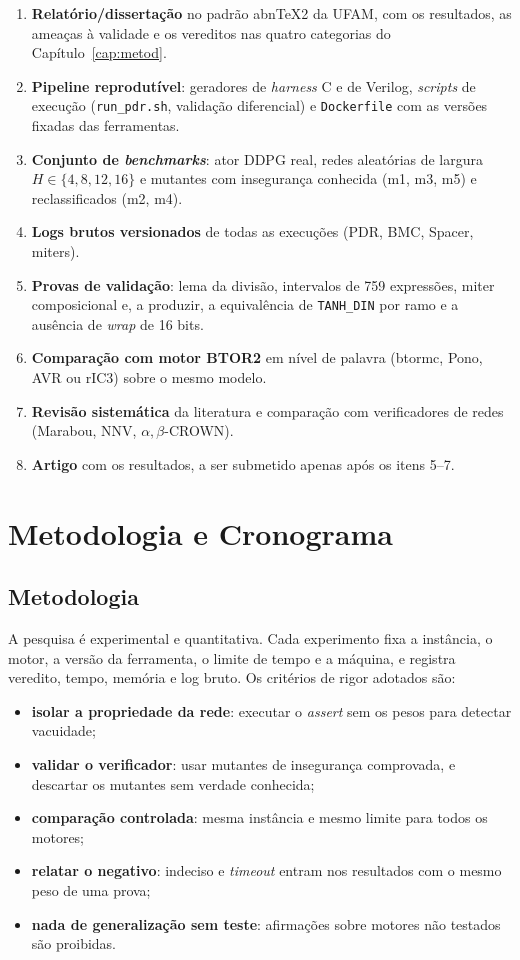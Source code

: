 \documentclass[12pt,openright,oneside,a4paper,chapter=TITLE,sumario=tradicional,english,brazil]{abntex2}
\begin{document}
\begin{enumerate}
  \item \textbf{Relatório/dissertação} no padrão abnTeX2 da UFAM, com os resultados, as ameaças à validade e os vereditos nas quatro categorias do Capítulo~\ref{cap:metod}.
  \item \textbf{Pipeline reprodutível}: geradores de \emph{harness} C e de Verilog, \emph{scripts} de execução (\texttt{run\_pdr.sh}, validação diferencial) e \texttt{Dockerfile} com as versões fixadas das ferramentas.
  \item \textbf{Conjunto de \emph{benchmarks}}: ator DDPG real, redes aleatórias de largura $H\in\{4,8,12,16\}$ e mutantes com insegurança conhecida (m1, m3, m5) e reclassificados (m2, m4).
  \item \textbf{Logs brutos versionados} de todas as execuções (PDR, BMC, Spacer, miters).
  \item \textbf{Provas de validação}: lema da divisão, intervalos de 759 expressões, miter composicional e, a produzir, a equivalência de \texttt{TANH\_DIN} por ramo e a ausência de \emph{wrap} de 16 bits.
  \item \textbf{Comparação com motor BTOR2} em nível de palavra (btormc, Pono, AVR ou rIC3) sobre o mesmo modelo.
  \item \textbf{Revisão sistemática} da literatura e comparação com verificadores de redes (Marabou, NNV, $\alpha,\beta$-CROWN).
  \item \textbf{Artigo} com os resultados, a ser submetido apenas após os itens 5--7.
\end{enumerate}

\chapter{Metodologia e Cronograma}\label{cap:crono}

\section{Metodologia}

A pesquisa é experimental e quantitativa. Cada experimento fixa a instância, o motor, a versão da ferramenta, o limite de tempo e a máquina, e registra veredito, tempo, memória e log bruto. Os critérios de rigor adotados são:
\begin{itemize}
  \item \textbf{isolar a propriedade da rede}: executar o \emph{assert} sem os pesos para detectar vacuidade;
  \item \textbf{validar o verificador}: usar mutantes de insegurança comprovada, e descartar os mutantes sem verdade conhecida;
  \item \textbf{comparação controlada}: mesma instância e mesmo limite para todos os motores;
  \item \textbf{relatar o negativo}: indeciso e \emph{timeout} entram nos resultados com o mesmo peso de uma prova;
  \item \textbf{nada de generalização sem teste}: afirmações sobre motores não testados são proibidas.
\end{itemize}
\end{document}
